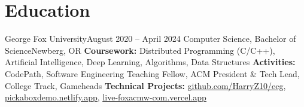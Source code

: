 \section{Education}
  \resumeSubHeadingListStart
    \resumeEducationSubheading
        {George Fox University}{August 2020 -- April 2024}
        {Computer Science, Bachelor of Science}{Newberg, OR}
        {\textbf{Coursework:} Distributed Programming (C/C++), Artificial Intelligence, Deep Learning, Algorithms, Data Structures}
        {\textbf{Activities:} CodePath, Software Engineering Teaching Fellow, ACM President \& Tech Lead, College Track, Gameheads}
        {\textbf{Technical Projects:}
          \underline{\href{https://github.com/HarryZ10/ecg}{{github.com/HarryZ10/ecg}}},
          \underline{\href{https://pickaboxdemo.netlify.app}{{pickaboxdemo.netlify.app}}},
          \underline{\href{https:/live-foxacmw-com.vercel.app}{live-foxacmw-com.vercel.app}}
        }
  \resumeSubHeadingListEnd


